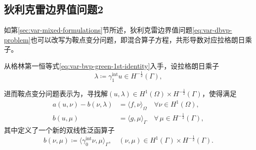 \subsection{狄利克雷边界值问题2}
\label{sec:var-bvp-dirichlet-lagrange}

如第\ref{sec:var-mixed-formulations}节所述，狄利克雷边界值问题\eqref{eq:var-dbvp-problem}也可以改写为鞍点变分问题，即混合算子方程，共形导数对应拉格朗日乘子\citep{Babuska:1973gu, Bramble:1981vv}。

从格林第一恒等式\eqref{eq:var-bvp-green-1st-identity}入手，设拉格朗日乘子
\begin{equation*}
  \lambda \coloneqq \gamma_1^{\text{int}} u \in H^{-\frac{1}{2}}(\Gamma),
\end{equation*}

进而鞍点变分问题表示为，寻找解$(u,\lambda) \in H^{1}(\Omega) \times H^{-\frac{1}{2}}(\Gamma)$，使得满足
\begin{equation}
  \label{eq:var-bvp-saddle-problem}
  \begin{split}
    a(u,\nu) - b(\nu,\lambda) &= \langle f,\nu \rangle_{\Omega} \quad \forall \nu \in H^{1}(\Omega),\\
    b(u,\mu) &= \langle g, \mu \rangle_{\Gamma} \quad \forall \, \mu \in H^{-\frac{1}{2}}(\Gamma),
  \end{split}
\end{equation}
其中定义了一个新的双线性泛函算子
\begin{equation*}
  b(\nu,\mu) \coloneqq \langle \gamma_{0}^{\text{int}} \nu, \mu \rangle_{\Gamma}, \quad (\nu,\mu) \in H^{1}(\Gamma) \times H^{-\frac{1}{2}}(\Gamma).
\end{equation*}

